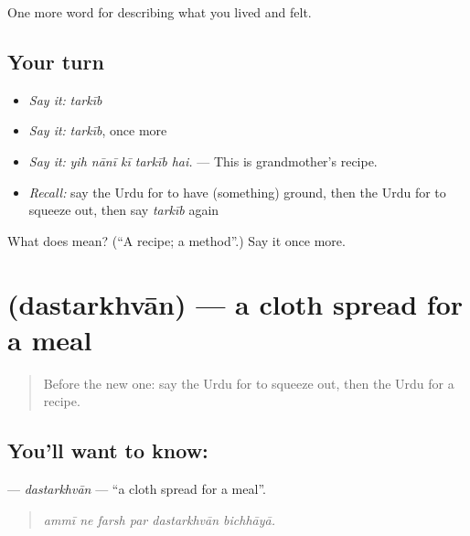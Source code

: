\begin{grammarlens}[title={What you've built}]
One more word for describing what you lived and felt.
\end{grammarlens}

\subsection*{Your turn}
\begin{itemize}
\raggedright
  \item \emph{Say it:} \emph{tarkīb}
  \item \emph{Say it:} \emph{tarkīb}, once more
  \item \emph{Say it:} \emph{yih nānī kī tarkīb hai.} — This is grandmother's recipe.
  \item \emph{Recall:} say the Urdu for to have (something) ground, then the Urdu for to squeeze out, then say \emph{tarkīb} again
\end{itemize}

\begin{tcolorbox}[breakable,colback=teal!4,colframe=teal!35!black,title={Before you move on}]
What does  mean? (\textquotedblleft{}A recipe; a method\textquotedblright{}.) Say it once more.
\end{tcolorbox}
\section[\texorpdfstring{\ur{دسترخوان} (dastarkhvān)}{دسترخوان (dastarkhvān)}]{ (dastarkhvān) — a cloth spread for a meal}

\label{lesson:UR-C511-dastarkhvan}



\begin{quote}
Before the new one: say the Urdu for to squeeze out, then the Urdu for a recipe.
\end{quote}

\subsection*{You'll want to know: }
\textbf{} — \emph{dastarkhvān} — \textquotedblleft{}a cloth spread for a meal\textquotedblright{}.

\begin{quote}
     
\end{quote}

\begin{quote}
\emph{ammī ne farsh par dastarkhvān bichhāyā.}
\end{quote}

